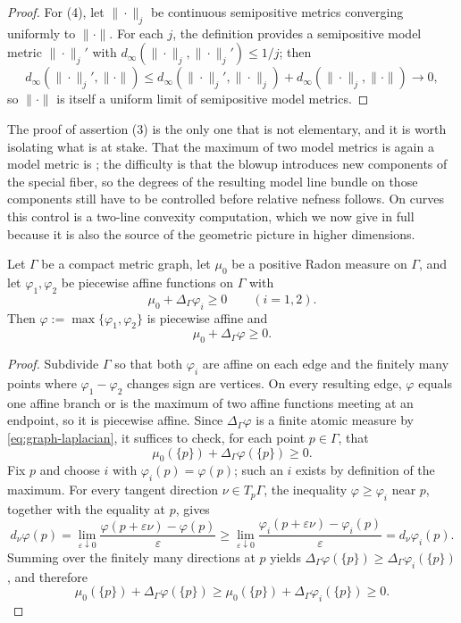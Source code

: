 \begin{proof}
For (4), let $\|\cdot\|_j$ be continuous semipositive metrics converging
uniformly to $\|\cdot\|$. For each $j$, the definition provides a
semipositive model metric $\|\cdot\|_j'$ with
$d_\infty(\|\cdot\|_j,\|\cdot\|_j')\le1/j$; then
\[
 d_\infty(\|\cdot\|_j',\|\cdot\|)\le
 d_\infty(\|\cdot\|_j',\|\cdot\|_j)+d_\infty(\|\cdot\|_j,\|\cdot\|)
 \longrightarrow0 ,
\]
so $\|\cdot\|$ is itself a uniform limit of semipositive model metrics.
\end{proof}

The proof of assertion (3) is the only one that is not elementary, and it is
worth isolating what is at stake. That the maximum of two model metrics is
again a model metric is ; the difficulty is
that the blowup introduces new components of the special fiber, so the
degrees of the resulting model line bundle on those components still have
to be controlled before relative nefness follows. On curves this control is
a two-line convexity computation, which we now give in full because it is
also the source of the geometric picture in higher dimensions.

\begin{lemma}
\label{lem:metrics-max-graph}
Let $\Gamma$ be a compact metric graph, let $\mu_0$ be a positive Radon
measure on $\Gamma$, and let $\varphi_1,\varphi_2$ be piecewise affine
functions on $\Gamma$ with
\[
 \mu_0+\Delta_\Gamma\varphi_i\ge0\qquad(i=1,2).
\]
Then $\varphi:=\max\{\varphi_1,\varphi_2\}$ is piecewise affine and
\[
 \mu_0+\Delta_\Gamma\varphi\ge0 .
\]
\end{lemma}

\begin{proof}
Subdivide $\Gamma$ so that both $\varphi_i$ are affine on each edge and
the finitely many points where $\varphi_1-\varphi_2$ changes sign are
vertices. On every resulting edge, $\varphi$ equals one affine branch or is
the maximum of two affine functions meeting at an endpoint, so it is
piecewise affine. Since
$\Delta_\Gamma\varphi$ is a finite atomic measure by
\eqref{eq:graph-laplacian}, it suffices to check, for each point
$p\in\Gamma$, that
\[
 \mu_0(\{p\})+\Delta_\Gamma\varphi(\{p\})\ge0 .
\]
Fix $p$ and choose $i$ with $\varphi_i(p)=\varphi(p)$; such an $i$
exists by definition of the maximum. For every tangent direction
$\nu\in T_p\Gamma$, the inequality $\varphi\ge\varphi_i$ near $p$,
together with the equality at $p$, gives
\[
 d_\nu\varphi(p)
 =\lim_{\varepsilon\downarrow0}
   \frac{\varphi(p+\varepsilon\nu)-\varphi(p)}{\varepsilon}
 \ge
 \lim_{\varepsilon\downarrow0}
   \frac{\varphi_i(p+\varepsilon\nu)-\varphi_i(p)}{\varepsilon}
 =d_\nu\varphi_i(p).
\]
Summing over the finitely many directions at $p$ yields
$\Delta_\Gamma\varphi(\{p\})\ge\Delta_\Gamma\varphi_i(\{p\})$, and
therefore
\[
 \mu_0(\{p\})+\Delta_\Gamma\varphi(\{p\})
 \ge\mu_0(\{p\})+\Delta_\Gamma\varphi_i(\{p\})\ge0 .
\]
\end{proof}


